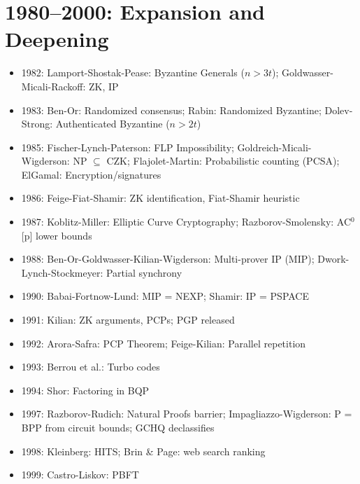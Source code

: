 \section{1980--2000: Expansion and Deepening}
\begin{itemize}
\item 1982: Lamport-Shostak-Pease: Byzantine Generals ($n>3t$); Goldwasser-Micali-Rackoff: ZK, IP
\item 1983: Ben-Or: Randomized consensus; Rabin: Randomized Byzantine; Dolev-Strong: Authenticated Byzantine ($n>2t$)
\item 1985: Fischer-Lynch-Paterson: FLP Impossibility; Goldreich-Micali-Wigderson: NP $\subseteq$ CZK; Flajolet-Martin: Probabilistic counting (PCSA); ElGamal: Encryption/signatures
\item 1986: Feige-Fiat-Shamir: ZK identification, Fiat-Shamir heuristic
\item 1987: Koblitz-Miller: Elliptic Curve Cryptography; Razborov-Smolensky: AC$^0$[p] lower bounds
\item 1988: Ben-Or-Goldwasser-Kilian-Wigderson: Multi-prover IP (MIP); Dwork-Lynch-Stockmeyer: Partial synchrony
\item 1990: Babai-Fortnow-Lund: MIP = NEXP; Shamir: IP = PSPACE
\item 1991: Kilian: ZK arguments, PCPs; PGP released
\item 1992: Arora-Safra: PCP Theorem; Feige-Kilian: Parallel repetition
\item 1993: Berrou et al.: Turbo codes
\item 1994: Shor: Factoring in BQP
\item 1997: Razborov-Rudich: Natural Proofs barrier; Impagliazzo-Wigderson: P = BPP from circuit bounds; GCHQ declassifies
\item 1998: Kleinberg: HITS; Brin \& Page: web search ranking
\item 1999: Castro-Liskov: PBFT
\end{itemize}

